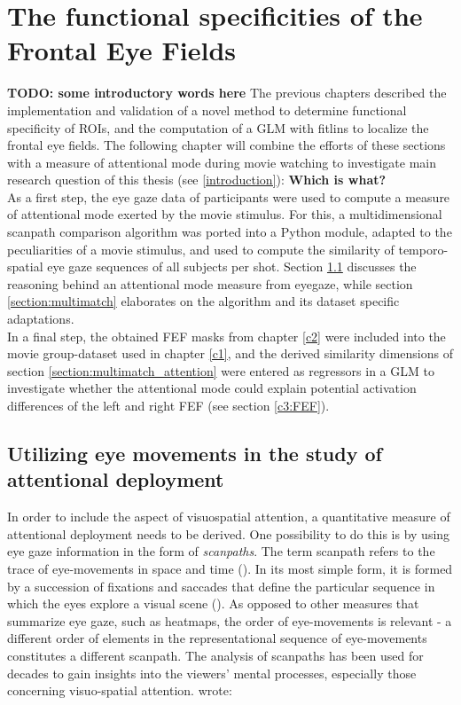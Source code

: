 \documentclass[a4paper, 12pt]{scrreprt}
\begin{document}
\chapter{The functional specificities of the Frontal Eye Fields}\label{c3}

\textbf{TODO: some introductory words here}
The previous chapters described the implementation and validation of a novel method to determine functional specificity of ROIs, and the computation of a GLM with fitlins to localize the frontal eye fields. The following chapter will combine the efforts of these sections with a measure of attentional mode during movie watching to investigate main research question of this thesis (see \ref{introduction}): \textbf{Which is what?} \\
As a first step, the eye gaze data of participants were used to compute a measure of attentional mode exerted by the movie stimulus. For this, a multidimensional scanpath comparison algorithm was ported into a Python module, adapted to the peculiarities of a movie stimulus, and used to compute the similarity of temporo-spatial eye gaze sequences of all subjects per shot. Section \ref{section:eyeutils} discusses the reasoning behind an attentional mode measure from eyegaze, while section \ref{section:multimatch} elaborates on the algorithm and its dataset specific adaptations. \\
In a final step, the obtained FEF masks from chapter \ref{c2} were included into the movie group-dataset used in chapter \ref{c1}, and the derived similarity dimensions of section \ref{section:multimatch_attention} were entered as regressors in a GLM to investigate whether the attentional mode could explain potential activation differences of the left and right FEF (see section \ref{c3:FEF}). 

\section{Utilizing eye movements in the study of attentional deployment}\label{section:eyeutils}

In order to include the aspect of visuospatial attention, a quantitative measure of attentional deployment needs to be derived. One possibility to do this is by using eye gaze information in the form of \textit{scanpaths}.
The term scanpath refers to the trace of eye-movements in space and time (\cite{holmqvist2011eye}). In its most simple form, it is formed by a succession of fixations and saccades that define the particular sequence in which the eyes explore a visual scene (\cite{anderson2015comparison}). As opposed to other measures that summarize eye gaze, such as heatmaps, the order of eye-movements is relevant - a different order of elements in the representational sequence of eye-movements constitutes a different scanpath. \newline
The analysis of scanpaths has been used for decades to gain insights into the viewers’ mental processes, especially those concerning visuo-spatial attention. \textcite{yarbus1967eye} wrote: 
\end{document}
